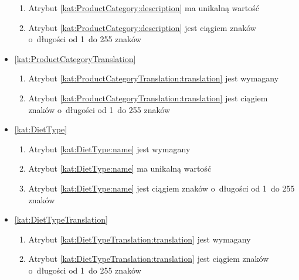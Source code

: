 \begin{itemize}[label={\textbf{Ograniczenia dla}}, wide, labelwidth=!, labelindent=0pt]
\begin{enumerate}[label={\textbf{OGR/2/\protect\twodigits{\arabic{enumi}}}}, wide, labelwidth=!, align=left, leftmargin=3cm, resume]
        \item Atrybut \ref{kat:ProductCategory:description} ma unikalną wartość

        \item Atrybut \ref{kat:ProductCategory:description} jest ciągiem znaków o~długości od 1~do 255 znaków
    \end{enumerate}

    \item\ref{kat:ProductCategoryTranslation}\mynobreakpar
    \begin{enumerate}[label={\textbf{OGR/2/\protect\twodigits{\arabic{enumi}}}}, wide, labelwidth=!, align=left, leftmargin=3cm, resume]
        \item Atrybut \ref{kat:ProductCategoryTranslation:translation} jest wymagany

        \item Atrybut \ref{kat:ProductCategoryTranslation:translation} jest ciągiem znaków o~długości od 1~do 255 znaków
    \end{enumerate}

    \item\ref{kat:DietType}\mynobreakpar
    \begin{enumerate}[label={\textbf{OGR/2/\protect\twodigits{\arabic{enumi}}}}, wide, labelwidth=!, align=left, leftmargin=3cm, resume]
        \item Atrybut \ref{kat:DietType:name} jest wymagany

        \item Atrybut \ref{kat:DietType:name} ma unikalną wartość

        \item Atrybut \ref{kat:DietType:name} jest ciągiem znaków o~długości od 1~do 255 znaków
    \end{enumerate}

    \item\ref{kat:DietTypeTranslation}\mynobreakpar
    \begin{enumerate}[label={\textbf{OGR/2/\protect\twodigits{\arabic{enumi}}}}, wide, labelwidth=!, align=left, leftmargin=3cm, resume]
        \item Atrybut \ref{kat:DietTypeTranslation:translation} jest wymagany

        \item Atrybut \ref{kat:DietTypeTranslation:translation} jest ciągiem znaków o~długości od 1~do 255 znaków
    \end{enumerate}
\end{itemize}


